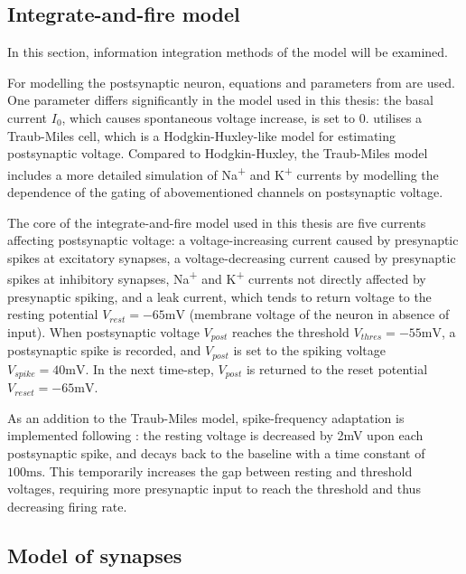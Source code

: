 \documentclass[a4paper,12pt]{report}
\theoremstyle{definition}
\begin{document}
\subsection{Integrate-and-fire model}

In this section, information integration methods of the model will be examined.

For modelling the postsynaptic neuron, equations and parameters from \cite{ermentrout1998fine} are used. One parameter differs significantly in the model used in this thesis: the basal current $I_0$, which causes spontaneous voltage increase, is set to $0$. \cite{ermentrout1998fine} utilises a Traub-Miles cell, which is a Hodgkin-Huxley-like model for estimating postsynaptic voltage. Compared to Hodgkin-Huxley, the Traub-Miles model includes a more detailed simulation of Na\textsuperscript{+} and K\textsuperscript{+} currents by modelling the dependence of the gating of abovementioned channels on postsynaptic voltage.

The core of the integrate-and-fire model used in this thesis are five currents affecting postsynaptic voltage: a voltage-increasing current caused by presynaptic spikes at excitatory synapses, a voltage-decreasing current caused by presynaptic spikes at inhibitory synapses, Na\textsuperscript{+} and K\textsuperscript{+} currents not directly affected by presynaptic spiking, and a leak current, which tends to return voltage to the resting potential $V_{rest}=-65\mathrm{mV}$ (membrane voltage of the neuron in absence of input). When postsynaptic voltage $V_{post}$ reaches the threshold $V_{thres}=-55\mathrm{mV}$, a postsynaptic spike is recorded, and $V_{post}$ is set to the spiking voltage $V_{spike}=40\mathrm{mV}$. In the next time-step, $V_{post}$ is returned to the reset potential $V_{reset}=-65\mathrm{mV}$.

As an addition to the Traub-Miles model, spike-frequency adaptation is implemented following \cite{yeung2004synaptic}: the resting voltage is decreased by 2mV upon each postsynaptic spike, and decays back to the baseline with a time constant of $100\mathrm{ms}$. This temporarily increases the gap between resting and threshold voltages, requiring more presynaptic input to reach the threshold and thus decreasing firing rate.




\subsection{Model of synapses}
\end{document}
